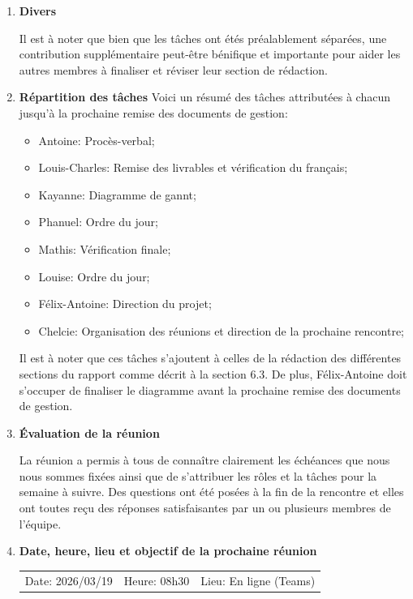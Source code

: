 \documentclass[12pt]{ULojpv}
\begin{document}
\begin{enumerate}
\item \textbf{Divers}

Il est à noter que bien que les tâches ont étés préalablement séparées, une contribution supplémentaire peut-être bénifique et importante pour aider les autres membres à finaliser et réviser leur section de rédaction.

\item \textbf{Répartition des tâches}
Voici un résumé des tâches attributées à chacun jusqu'à la prochaine remise des documents de gestion:

\begin{itemize}
   \item Antoine: Procès-verbal;
   \item Louis-Charles: Remise des livrables et vérification du français;
   \item Kayanne: Diagramme de gannt;
   \item Phanuel: Ordre du jour;
   \item Mathis: Vérification finale;
   \item Louise: Ordre du jour;
   \item Félix-Antoine: Direction du projet;
   \item Chelcie: Organisation des réunions et direction de la prochaine rencontre;
\end{itemize}

Il est à noter que ces tâches s'ajoutent à celles de la rédaction des différentes sections du rapport comme décrit à la section 6.3. De plus, Félix-Antoine doit s'occuper de finaliser le diagramme avant la prochaine remise des documents de gestion.



\item \textbf{Évaluation de la réunion}

La réunion a permis à tous de connaître clairement les échéances que nous nous sommes fixées ainsi que de
s'attribuer les rôles et la tâches pour la semaine à suivre. Des questions ont été posées à la fin de la rencontre et elles ont toutes reçu des réponses satisfaisantes par un ou plusieurs membres de l'équipe.

\item \textbf{Date, heure, lieu et objectif de la prochaine réunion}

\begin{tabular}{@{}lll}
   Date: 2026/03/19
   & Heure: 08h30
   &  Lieu: En ligne (Teams)
\end{tabular}



\end{enumerate}
\end{document}
